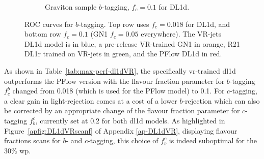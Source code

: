 \begin{figure}
\begin{subfigure}[t]{0.32\textwidth}
    \caption{Graviton sample $b$-tagging, $f_c = 0.1$ for DL1d.}
    \label{fig:dl1dVRROCgrc}
  \end{subfigure}
  \vspace{-0.3cm}
  \caption{ROC curves for $b$-tagging. Top row uses $f_c = 0.018$ for DL1d, and bottom row $f_c = 0.1$ (GN1 $f_c = 0.05$ everywhere). The VR-jets DL1d model is in blue, a pre-release VR-trained GN1 in orange, R21 DL1r trained on VR-jets in green, and the PFlow DL1d in red.}
  \label{fig:dl1dVRROC}
\end{figure}

As shown in Table~\ref{tab:max-perf-dl1dVR}, the specifically \gls{vr}-trained \gls{dl1d} outperforms the PFlow version with the flavour fraction parameter for $b$-tagging $f^b_c$ changed from 0.018 (which is used for the PFlow model) to 0.1. For $c$-tagging, a clear gain in light-rejection comes at a cost of a lower $b$-rejection which can also be corrected by an appropriate change of the flavour fraction parameter for $c$-tagging $f^c_b$, currently set at 0.2 for both \gls{dl1d} models. As highlighted in Figure~\ref{apfig:DL1dVRscanf} of Appendix \ref{ap-DL1dVR}, displaying flavour fractions scans for $b$- and $c$-tagging, this choice of $f^c_b$ is indeed suboptimal for the 30\% \gls{wp}. 

